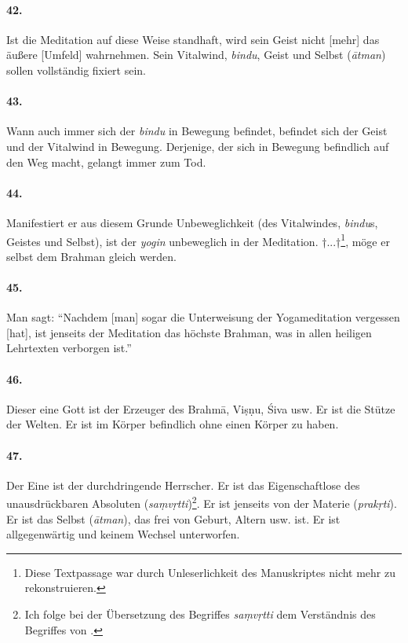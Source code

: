 \documentclass[a4paper,12pt]{article}
\begin{document}
\paragraph{42.} Ist die Meditation auf diese Weise standhaft, wird sein Geist nicht [mehr] das äußere [Umfeld] wahrnehmen. Sein Vitalwind, \textit{bindu}, Geist und Selbst (\textit{ātman}) sollen vollständig fixiert sein.


\paragraph{43.} Wann auch immer sich der \textit{bindu} in Bewegung befindet, befindet sich der Geist und der Vitalwind in Bewegung. Derjenige, der sich in Bewegung befindlich auf den Weg macht, gelangt immer zum Tod.

\paragraph{44.} Manifestiert er aus diesem Grunde Unbeweglichkeit (des Vitalwindes, \textit{bindu}s, Geistes und Selbst), ist der \textit{yogin} unbeweglich in der Meditation. †...†\footnote{Diese Textpassage war durch Unleserlichkeit des Manuskriptes nicht mehr zu rekonstruieren.}, möge er selbst dem Brahman gleich werden. 

\paragraph{45.} Man sagt: ``Nachdem [man] sogar die Unterweisung der Yogameditation vergessen [hat], ist jenseits der Meditation das höchste Brahman, was in allen heiligen Lehrtexten verborgen ist.''

\paragraph{46.} Dieser eine Gott ist der Erzeuger des Brahmā, Viṣṇu, Śiva usw. Er ist die Stütze der Welten. Er ist im Körper befindlich ohne einen Körper zu haben. 

\paragraph{47.} Der Eine ist der durchdringende Herrscher. Er ist das Eigenschaftlose des unausdrückbaren Absoluten (\textit{saṃvṛtti})\footnote{Ich folge bei der Übersetzung des Begriffes \textit{saṃvṛtti} dem Verständnis des Begriffes von \parencite[17]{kawamura1991}.}. Er ist jenseits von der Materie (\textit{prakṛti}). Er ist das Selbst (\textit{ātman}), das frei von Geburt, Altern usw. ist. Er ist allgegenwärtig und keinem Wechsel unterworfen.
\end{document}
